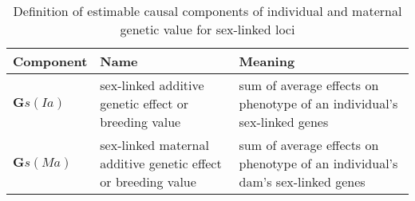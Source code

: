 \begin{table}
\centering
\caption{Definition of estimable causal components of individual and maternal genetic value  for sex-linked loci}
\label{tab.imsex}
\vspace{0.1in}
\begin{tabular}{l|p{1.2in}|p{2.4in}}
Component & Name & Meaning \\ \hline
${\bm Gs(Ia)}$     & sex-linked additive genetic effect or breeding value &  sum of average effects on phenotype of an individual's sex-linked genes \\
${\bm Gs(Ma)}$     & sex-linked maternal additive genetic effect  or breeding value & sum of average effects on phenotype of an individual's dam's  sex-linked genes \\  \hline
\end{tabular}
\end{table}

